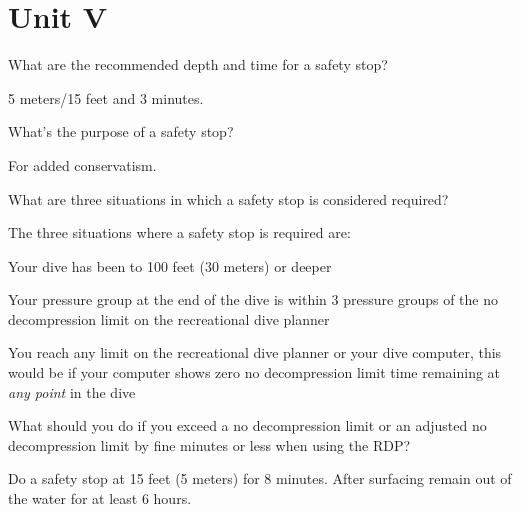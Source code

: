 	\chapter*{Unit V}
	\setcounter{questionnumber}{0}

	\begin{qanda}
		\begin{question}
What are the recommended depth and time for a safety stop?
		\end{question}

		\begin{answer}
5 meters/15 feet and 3 minutes.
		\end{answer}
	\end{qanda}

	\begin{qanda}
		\begin{question}
What's the purpose of a safety stop?
		\end{question}

		\begin{answer}
For added conservatism.
		\end{answer}
	\end{qanda}

	\begin{qanda}
		\begin{question}
What are three situations in which a safety stop is considered required?
		\end{question}

		\begin{answer}
The three situations where a safety stop is required are:
			\begin{nospacenumberedlist}
				\item Your dive has been to 100 feet (30 meters) or deeper
				\item Your pressure group at the end of the dive is within 3 pressure groups of the no decompression limit on the recreational dive planner
				\item You reach any limit on the recreational dive planner or your dive computer, this would be if your computer shows zero no decompression limit time remaining at \emph{any point} in the dive
			\end{nospacenumberedlist}
		\end{answer}
	\end{qanda}

	\begin{qanda}
		\begin{question}
What should you do if you exceed a no decompression limit or an adjusted no decompression limit by fine minutes or less when using the RDP?
		\end{question}

		\begin{answer}
Do a safety stop at 15 feet (5 meters) for 8 minutes.  After surfacing remain out of the water for at least 6 hours.
		\end{answer}
	\end{qanda}

